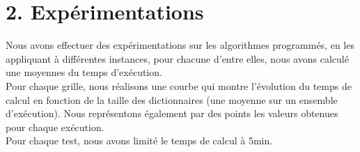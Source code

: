 \documentclass[a4paper,12pt]{report}
\begin{document}
\section*{2. Expérimentations}


Nous avons effectuer des expérimentations sur les algorithmes programmés, en les appliquant à différentes instances, pour chacune d'entre elles, nous avons calculé une moyennes du temps d'exécution.\\
Pour chaque grille, nous réalisons une courbe qui montre l'évolution du temps de calcul en fonction de la taille des dictionnaires (une moyenne sur un ensemble d'exécution). Nous représentons également par des points les valeurs obtenues pour chaque exécution.\\
Pour chaque test, nous avons limité le temps de calcul à 5min.
\end{document}
